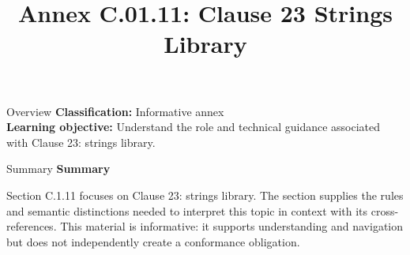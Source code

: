 \documentclass[10pt,letterpaper]{article}
\title{Annex C.01.11: Clause 23 Strings Library}
\author{}
\date{}
\begin{document}
\maketitle
\begin{CornellOverviewBox}{Overview}
\textbf{Classification:} Informative annex\\[2pt]
\textbf{Learning objective:} Understand the role and technical guidance associated with Clause 23: strings library.
\end{CornellOverviewBox}\begin{CornellSummaryBox}{Summary}
{\sffamily\bfseries\color{Accent} Summary}\par\vspace{3pt}Section C.1.11 focuses on Clause 23: strings library. The section supplies the rules and semantic distinctions needed to interpret this topic in context with its cross-references. This material is informative: it supports understanding and navigation but does not independently create a conformance obligation.
\end{CornellSummaryBox}
\end{document}
